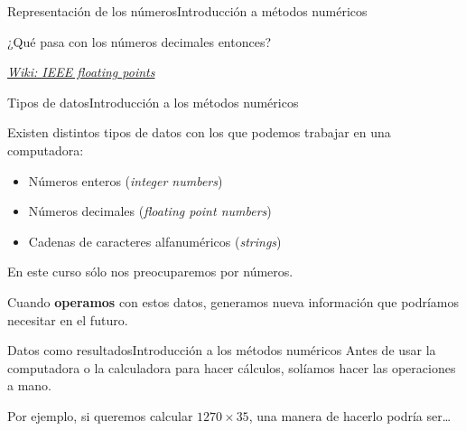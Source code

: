 \documentclass[spanish, c]{beamer}
\begin{document}
\begin{frame}{Representación de los números}{Introducción a métodos numéricos}

    \begin{center}
        \LARGE
        ¿Qué pasa con los números decimales entonces?
    \end{center}\pause
    
    \bigskip
    
    \begin{center}
        \textit{\href{https://en.wikipedia.org/wiki/Floating-point\_arithmetic}{Wiki: IEEE floating points}}
    \end{center}
    
\end{frame}

\begin{frame}{Tipos de datos}{Introducción a los métodos numéricos}
    
   Existen distintos \alert{tipos de datos} con los que podemos trabajar en una computadora: \pause

    \bigskip

    \begin{itemize}[<+->]
        \item Números enteros (\textit{integer numbers})
        \item Números decimales (\textit{floating point numbers})
        \item Cadenas de caracteres alfanuméricos (\textit{strings})
    \end{itemize} \pause

    \bigskip
    
    En este curso sólo nos preocuparemos por números. \pause

    Cuando \textbf{operamos} con estos datos, generamos nueva información que podríamos necesitar en el futuro.

\end{frame}

\begin{frame}{Datos como resultados}{Introducción a los métodos numéricos}
    Antes de usar la computadora o la calculadora para hacer cálculos, solíamos hacer las operaciones a mano.

    \bigskip
    
    Por ejemplo, si queremos calcular $1270 \times 35$, una manera de hacerlo podría ser\dots

\end{frame}
\end{document}
